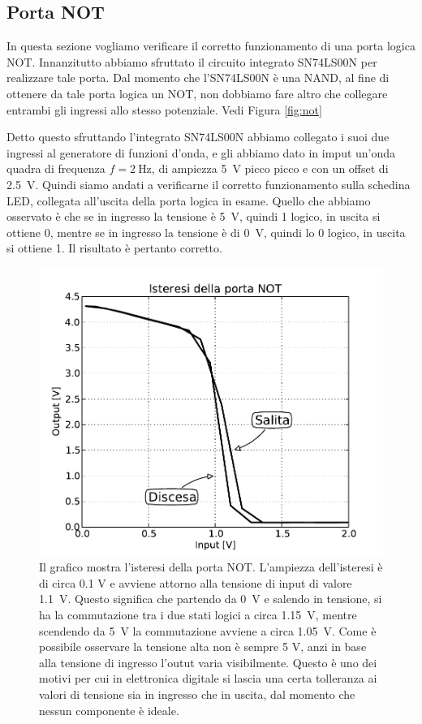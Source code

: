 \subsection*{Porta NOT}

In questa sezione vogliamo verificare il corretto funzionamento di una porta logica NOT. Innanzitutto abbiamo sfruttato il circuito integrato SN74LS00N per realizzare tale porta. Dal momento che l'SN74LS00N è una NAND, al fine di ottenere da tale porta logica un NOT, non dobbiamo fare altro che collegare entrambi gli ingressi allo stesso potenziale. Vedi Figura \ref{fig:not}

Detto questo sfruttando l'integrato SN74LS00N abbiamo collegato i suoi due ingressi al generatore di funzioni d'onda, e gli abbiamo dato in imput un'onda quadra di frequenza $f=\SI{2}{\hertz}$, di ampiezza \SI{5}{\volt} picco picco e con un offset di \SI{2.5}{\volt}.
Quindi siamo andati a verificarne il corretto funzionamento sulla schedina LED, collegata all'uscita della porta logica in esame. Quello che abbiamo osservato è che se in ingresso la tensione è \SI{+5}{\volt}, quindi 1 logico, in uscita si ottiene 0, mentre se in ingresso la tensione è di \SI{0}{\volt}, quindi lo 0 logico, in uscita si ottiene 1. Il risultato è pertanto corretto.%

\begin{figure}
    \centering
    \includegraphics[width=0.55\columnwidth]{ist.pdf}
    \caption{Il grafico mostra l'isteresi della porta NOT. L'ampiezza dell'isteresi è di circa 0.1 V e avviene attorno alla tensione di input di valore \SI{1.1}{\volt}. Questo significa che partendo da \SI{0}{\volt} e salendo in tensione, si ha la commutazione tra i due stati logici a circa \SI{1.15}{\volt}, mentre scendendo da \SI{5}{\volt} la commutazione avviene a circa \SI{1.05}{\volt}. Come è possibile osservare la tensione alta non è sempre 5 V, anzi in base alla tensione di ingresso l'outut varia visibilmente. Questo è uno dei motivi per cui in elettronica digitale si lascia una certa tolleranza ai valori di tensione sia in ingresso che in uscita, dal momento che nessun componente è ideale.}
    \label{fig:not_tensioni}
\end{figure}

